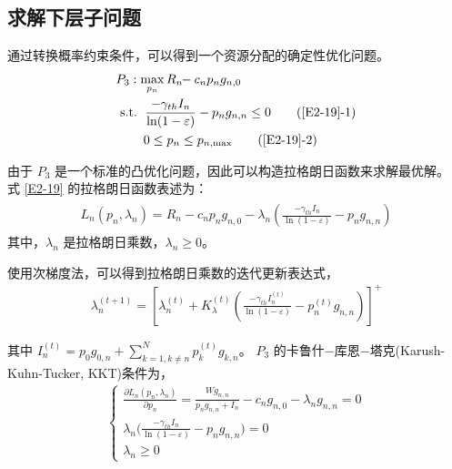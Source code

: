 \subsection{求解下层子问题}\label{section2-3-2}
通过转换概率约束条件，可以得到一个资源分配的确定性优化问题。
\begin{align}  \label{E2-19}
&P_3: \max \limits_{p_{n}} R_{n}\!\!-c_{n} p_n g_{n,0}              \\
&\text { s.t. }
 \quad \!\!\!\!\! \frac{-\gamma_{th} I_{n}}{\ln(1-\varepsilon)}-p_n g_{n,n}\leq0 \tag{\ref{E2-19}{-1}} \label{E2-19-1}\\ %
& \quad \quad \quad \!\!\!\!\! 0\leq p_n\leq p_{n,\textrm{max}}                  \tag{\ref{E2-19}{-2}} \label{E2-19-2}  %
\end{align}

由于 $P_3$ 是一个标准的凸优化问题，因此可以构造拉格朗日函数来求解最优解。 式 \eqref{E2-19} 的拉格朗日函数表述为：
\begin{eqnarray}\label{E2-20}
\begin{array}{lll}
\textit{L}_n(p_n, \lambda_n)=R_{n}\!\!-\!\!c_{n} p_n g_{n,0}\!\!-\!\!\lambda_n \left(\frac{-\gamma_{th} I_{n}}{\ln(1-\varepsilon)}-p_n g_{n,n}\right)
\end{array}
\end{eqnarray}
其中，$\lambda_n$ 是拉格朗日乘数，$\lambda_n \geq 0$。

使用次梯度法，可以得到拉格朗日乘数的迭代更新表达式，
\begin{equation}\label{E2-21}
\begin{array}{lll}
     \lambda_n^{(t+1)}=[\lambda_n^{(t)}\!\!+\!K_{\lambda}^{(t)}(\frac{-\gamma_{th} I_{n}^{(t)}}{\ln(1-\varepsilon)}-p_n^{(t)} g_{n,n})]^+
\end{array}
\end{equation}

其中 $I_{n}^{(t)}=$$p_0 g_{0,n}+\sum_{k=1,k\neq n}^N p_k^{(t)} g_{k,n}$。
$P_3$ 的卡鲁什$-$库恩$-$塔克(Karush-Kuhn-Tucker, KKT)条件为，
\begin{equation}\label{E2-22}
\begin{array}{rl}
\left\{
\begin{array}{lll}
     \frac{\partial \textit{L}_n(p_n, \lambda_n)}{\partial p_n}\!=\!\frac{W g_{n,n}}{p_n g_{n,n}+I_n}\!-\!c_n g_{n,0}\!-\!\lambda_n g_{n,n}\!=\!0\\
     \lambda_n \big(\frac{-\gamma_{th} I_{n}}{\ln(1-\varepsilon)}-p_n g_{n,n}\big)=0\\
     \lambda_n \geq 0
\end{array}
\right.
\end{array}
\end{equation}

